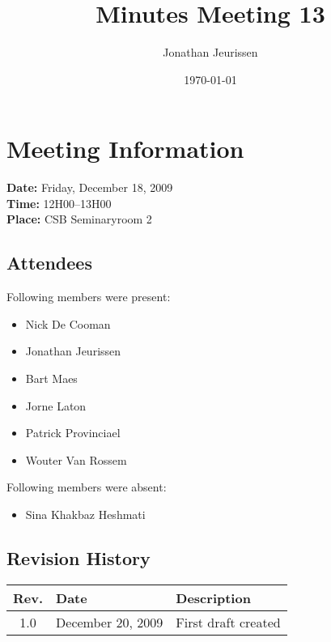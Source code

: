\documentclass[a4paper, 12pt]{article}
\begin{document}
\title{Minutes Meeting 13}
\author{Jonathan Jeurissen}
\date{\today}

\maketitle	
	\section{Meeting Information}
		\textbf{Date:} Friday, December 18, 2009\\
		\textbf{Time:} 12H00--13H00\\
		\textbf{Place:} CSB Seminaryroom 2\\
		\subsection{Attendees}
Following members were present:
			\begin{itemize}
				\item Nick De Cooman
				\item Jonathan Jeurissen
				\item Bart Maes
				\item Jorne Laton
				\item Patrick Provinciael
				\item Wouter Van Rossem
			\end{itemize}
Following members were absent:
			\begin{itemize}
			 \item Sina Khakbaz Heshmati
			\end{itemize}
			
		\subsection{Revision History}
			\begin{tabular}{c | l | l }
				\textbf{Rev.} & \textbf{Date} & \textbf{Description} \\
				\hline
				1.0 & December 20, 2009 & First draft created \\
			\end{tabular}		
\end{document}

